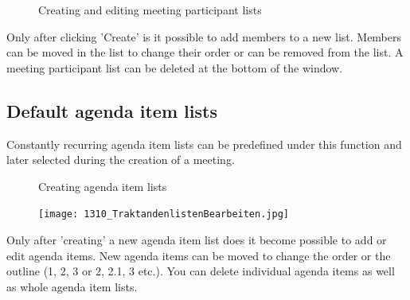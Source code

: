 \begin{figure}[H]
\end{figure}

\begin{figure}[H]
\vspace{-25pt}
\caption{Creating and editing meeting participant lists}
\end{figure}

Only after clicking 'Create' is it possible to add members to a new list. Members can be moved in the list to change their order or can be removed from the list. A meeting participant list can be deleted at the bottom of the window.

\clearpage
\subsection{Default agenda item lists}

Constantly recurring agenda item lists can be predefined under this function and later selected during the creation of a meeting.

\begin{figure}[H]
\caption{Creating agenda item lists}
\end{figure}

\begin{figure}
\vspace{-15pt}
\texttt{[image: 1310\_TraktandenlistenBearbeiten.jpg]}
\end{figure}

Only after 'creating' a new agenda item list does it become possible to add or edit agenda items. New agenda items can be moved to change the order or the outline (1, 2, 3 or 2, 2.1, 3 etc.). You can delete individual agenda items as well as whole agenda item lists.
